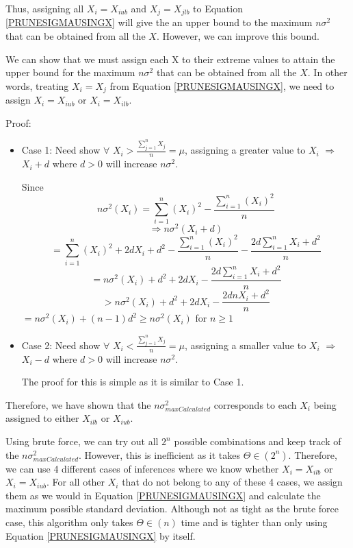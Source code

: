\documentclass[a4paper,12pt]{article}
\begin{document}
Thus, assigning all $X_{i} = X_{iub}$ and $X_{j} = X_{jlb}$ to Equation \ref{PRUNESIGMAUSINGX} will give the an upper bound to the maximum $n\sigma^2$ that can be obtained from all the $X$. However, we can improve this bound.

We can show that we must assign each X to their extreme values to attain the upper bound for the maximum $n\sigma^2$ that can be obtained from all the $X$. In other words, treating $X_{i} = X_{j}$ from Equation \ref{PRUNESIGMAUSINGX}, we need to assign $X_{i} = X_{iub}$ or $X_{i} = X_{ilb}$.

Proof: 
\begin{itemize}
\item Case 1: Need show $\forall$ $X_{i} > \frac{\sum_{j=1}^nX_{j}}{n} = \mu$, assigning a greater value to $X_{i}$ $\Rightarrow$ $X_{i} + d$ where $d > 0$ will increase 
$n\sigma^2$. 

Since $$n\sigma^2(X_{i}) = \sum_{i=1}^n(X_{i})^2 -
\frac{\sum_{i=1}^n(X_{i})^2}{n}$$
$$\Rightarrow n\sigma^2(X_{i}+d)$$
$$ = \sum_{i=1}^n(X_{i})^2 + 2dX_{i} + d^2 - \frac{\sum_{i=1}^n(X_{i})^2}{n} - \frac{2d\sum_{i=1}^nX_{i} + d^2}{n}$$ $$ = n\sigma^2(X_{i}) + d^2 + 2dX_{i} -\frac{2d\sum_{i=1}^nX_{i} + d^2}{n}$$
$$ > n\sigma^2(X_{i}) + d^2 + 2dX_{i} -\frac{2dnX_{i} + d^2}{n}$$
$ = n\sigma^2(X_{i}) + (n-1)d^2 \geq n\sigma^2(X_{i})$ for $n \geq 1$


\item Case 2: Need show $\forall$ $X_{i} < \frac{\sum_{j=1}^nX_{j}}{n} = \mu$, assigning a smaller value to $X_{i}$ $\Rightarrow$ $X_{i} - d$ where $d > 0$ will increase 
$n\sigma^2$. 

The proof for this is simple as it is similar to Case 1. 
\end{itemize}

Therefore, we have shown that the $n\sigma^2_{maxCalculated}$ corresponds to each $X_{i}$ being assigned to either $X_{ilb}$ or $X_{iub}$. 

Using brute force, we can try out all $2^n$ possible combinations and keep track of the $n\sigma^2_{maxCalculated}$. However, this is inefficient as it takes $\Theta \in (2^n)$. Therefore, we can use 4 different cases of inferences where we know whether $X_{i} = X_{ilb}$ or $X_{i} = X_{iub}$. For all other $X_{i}$ that do not belong to any of these 4 cases, we assign them as we would in Equation \ref{PRUNESIGMAUSINGX} and calculate the maximum possible standard deviation. Although not as tight as the brute force case, this algorithm only takes $\Theta \in (n)$ time and is tighter than only using Equation \ref{PRUNESIGMAUSINGX} by itself. 
\end{document}
